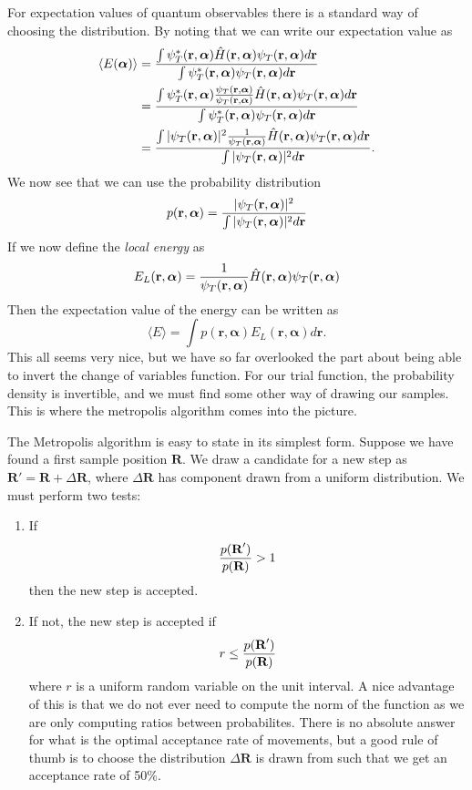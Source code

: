 \documentclass[aps,prc,twocolumn,floatfix]{revtex4}
\def\rvec{\textbf{r}}
\def\Rvec{\textbf{R}}
\def\alphavec{\boldsymbol\alpha}
\begin{document}
For expectation values of quantum observables there is a standard way of choosing the distribution. By noting that we can write our expectation value as 
\begin{align}
 \langle E(\alphavec) \rangle & = \frac{\int \psi^{\ast}_T(\rvec, \alphavec)\hat{H}(\rvec, \alphavec)\psi_T(\rvec, \alphavec) d\rvec} {\int\psi^{\ast}_T(\rvec, \alphavec)\psi_T(\rvec, \alphavec) d\rvec} \\
 & = \frac{\int \psi^{\ast}_T(\rvec, \alphavec){ \psi_T(\rvec, \alphavec) \over \psi_T(\rvec, \alphavec) }\hat{H}(\rvec, \alphavec)\psi_T(\rvec, \alphavec) d\rvec} {\int\psi^{\ast}_T(\rvec, \alphavec)\psi_T(\rvec, \alphavec) d\rvec} \\
 & = \frac{\int |\psi_T(\rvec, \alphavec)|^2{ 1 \over \psi_T(\rvec, \alphavec) }\hat{H}(\rvec, \alphavec)\psi_T(\rvec, \alphavec) d\rvec} {\int|\psi_T(\rvec, \alphavec)|^2 d\rvec}.
\end{align}
We now see that we can use the probability distribution 
\begin{align}
 p(\rvec, \alphavec) = { |\psi_T(\rvec, \alphavec)|^2 \over \int|\psi_T(\rvec, \alphavec)|^2 d\rvec }
\end{align}
If we now define the {\it local energy} as 
\begin{equation}
 E_L(\rvec, \alphavec) = {1 \over \psi_T(\rvec, \alphavec) }\hat{H}(\rvec, \alphavec)\psi_T(\rvec, \alphavec) 
\end{equation}
Then the expectation value of the energy can be written as
\begin{equation}
 \langle E \rangle = \int p(\rvec, \alphavec)E_L(\rvec, \alphavec) d\rvec.
\end{equation}
This all seems very nice, but we have so far overlooked the part about being able to invert the change of variables function. For our trial function, the probability density is invertible, and we must find some other way of drawing our samples. This is where the metropolis algorithm comes into the picture. 

The Metropolis algorithm is easy to state in its simplest form. Suppose we have found a first sample position $\Rvec$. We draw a candidate for a new step as $\Rvec' = \Rvec + \Delta \Rvec$, where $\Delta \Rvec$ has component drawn from a uniform distribution. We must perform two tests: 
\begin{enumerate}
 \item If 
 \begin{equation}
  {p(\Rvec') \over p(\Rvec)} > 1
 \end{equation}
 then the new step is accepted. 
 \item If not, the new step is accepted if
 \begin{equation}
  r \le {p(\Rvec') \over p(\Rvec)}
 \end{equation}
where $r$ is a uniform random variable on the unit interval. A nice advantage of this is that we do not ever need to compute the norm of the function as we are only computing ratios between probabilites. There is no absolute answer for what is the optimal acceptance rate of movements, but a good rule of thumb is to choose the distribution $\Delta \Rvec$ is drawn from such that we get an acceptance rate of 50\%. 
\end{enumerate}
\end{document}
